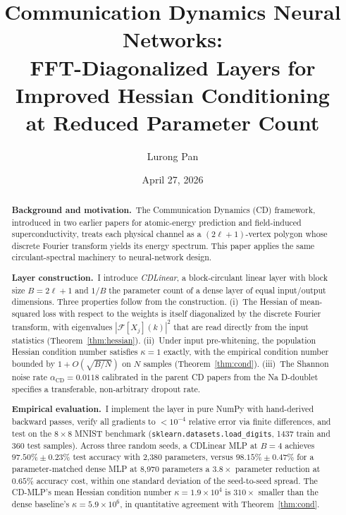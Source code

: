 \documentclass[aps,prx,onecolumn,11pt,nofootinbib,longbibliography]{revtex4-2}
\newcommand{\alphaCD}{\alpha_{\mathrm{CD}}}
\newcommand{\F}{\mathcal{F}}
\begin{document}
\title{Communication Dynamics Neural Networks:\\
       FFT-Diagonalized Layers for Improved Hessian Conditioning\\
       at Reduced Parameter Count}

\author{Lurong Pan}

\date{April 27, 2026}

\begin{abstract}
\noindent\textbf{Background and motivation.}~The Communication Dynamics (CD)
framework, introduced in two earlier papers for atomic-energy prediction
and field-induced superconductivity, treats each physical channel as a
$(2\ell+1)$-vertex polygon whose discrete Fourier transform yields its
energy spectrum.  This paper applies the same circulant-spectral machinery
to neural-network design.

\smallskip
\noindent\textbf{Layer construction.}~I introduce \emph{CDLinear}, a
block-circulant linear layer with block size $B = 2\ell+1$ and $1/B$ the
parameter count of a dense layer of equal input/output dimensions.  Three
properties follow from the construction.  (i)~The Hessian of mean-squared
loss with respect to the weights is itself diagonalized by the discrete
Fourier transform, with eigenvalues $|\F[X_j](k)|^2$ that are read directly
from the input statistics (Theorem~\ref{thm:hessian}).  (ii)~Under input
pre-whitening, the population Hessian condition number satisfies
$\kappa = 1$ exactly, with the empirical condition number bounded by
$1 + O(\sqrt{B/N})$ on $N$ samples (Theorem~\ref{thm:cond}).  (iii)~The
Shannon noise rate $\alphaCD = 0.0118$ calibrated in the parent CD papers
from the Na D-doublet specifies a transferable, non-arbitrary dropout rate.

\smallskip
\noindent\textbf{Empirical evaluation.}~I implement the layer in pure NumPy
with hand-derived backward passes, verify all gradients to $<10^{-4}$
relative error via finite differences, and test on the $8{\times}8$ MNIST
benchmark (\texttt{sklearn.datasets.load\_digits}, 1437 train and 360 test
samples).  Across three random seeds, a CDLinear MLP at $B=4$ achieves
$97.50\%\pm 0.23\%$ test accuracy with 2{,}380 parameters, versus
$98.15\%\pm 0.47\%$ for a parameter-matched dense MLP at 8{,}970
parameters\textemdash{} a $3.8\times$ parameter reduction at $0.65\%$
accuracy cost, within one standard deviation of the seed-to-seed spread.
The CD-MLP's mean Hessian condition number $\kappa = 1.9\times 10^{4}$ is
$310\times$ smaller than the dense baseline's $\kappa = 5.9\times 10^{6}$,
in quantitative agreement with Theorem~\ref{thm:cond}.


\end{abstract}
\end{document}
